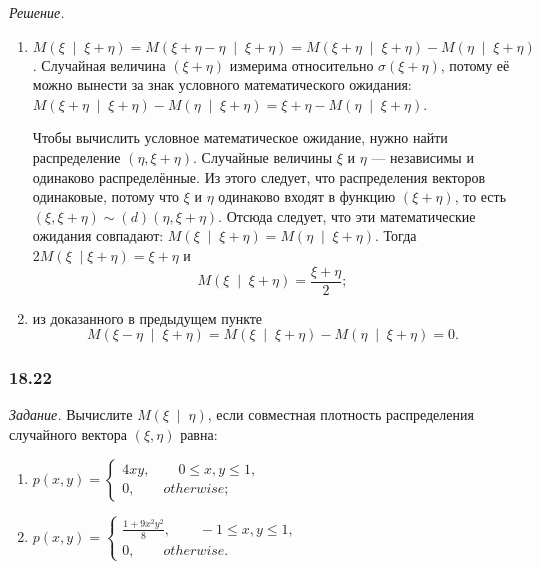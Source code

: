 \textit{Решение.}
\begin{enumerate}[label=\alph*)]
  \item $M \left( \xi \; \middle| \; \xi + \eta \right) =
    M \left( \xi + \eta - \eta \; \middle| \; \xi + \eta \right) =
    M \left( \xi + \eta \; \middle| \; \xi + \eta \right) -
    M \left( \eta \; \middle| \; \xi + \eta \right) $.
  Случайная величина $ \left( \xi + \eta \right) $ измерима относительно
  $ \sigma \left( \xi + \eta \right) $,
  потому её можно вынести за знак условного математического ожидания:
  $M \left( \xi + \eta \; \middle| \; \xi + \eta \right) -
    M \left( \eta \; \middle| \; \xi + \eta \right) =
    \xi + \eta - M \left( \eta \; \middle| \; \xi + \eta \right) $.

  Чтобы вычислить условное математическое ожидание,
  нужно найти распределение $ \left( \eta, \xi + \eta \right) $.
  Случайные величины $ \xi $ и $ \eta $ --- независимы и одинаково распределённые.
  Из этого следует, что распределения векторов одинаковые,
  потому что $ \xi $ и $ \eta $ одинаково входят в функцию $ \left( \xi + \eta \right) $,
  то есть $ \left( \xi, \xi + \eta \right) \sim \left( d \right) \left( \eta , \xi + \eta \right) $.
  Отсюда следует, что эти математические ожидания совпадают:
  $M \left( \xi \; \middle| \; \xi + \eta \right) =
    M \left( \eta \; \middle| \; \xi + \eta \right) $.
  Тогда $2M \left( \xi \; \middle| \xi + \eta \right) = \xi + \eta $ и
  $$M \left( \xi \; \middle| \; \xi + \eta \right) =
    \frac{ \xi + \eta }{2};$$
  \item из доказанного в предыдущем пункте
  $$M \left( \xi - \eta \; \middle| \; \xi + \eta \right) =
    M \left( \xi \; \middle| \; \xi + \eta \right) -
    M \left( \eta \; \middle| \; \xi + \eta \right) =
    0.$$
\end{enumerate}

\subsubsection*{18.22}

\textit{Задание.}
Вычислите $M \left( \xi \; \middle| \; \eta \right) $,
если совместная плотность распределения случайного вектора $ \left( \xi, \eta \right) $ равна:
\begin{enumerate}[label=\alph*)]
  \item $p \left( x, y \right) =
    \begin{cases}
      4xy, \qquad 0 \leq x, y \leq 1, \\
      0, \qquad otherwise;
    \end{cases}$
  \item $p \left( x, y \right) =
    \begin{cases}
      \frac{1 + 9x^2 y^2}{8}, \qquad -1 \leq x, y \leq 1, \\
      0, \qquad otherwise.
    \end{cases}$
\end{enumerate}

